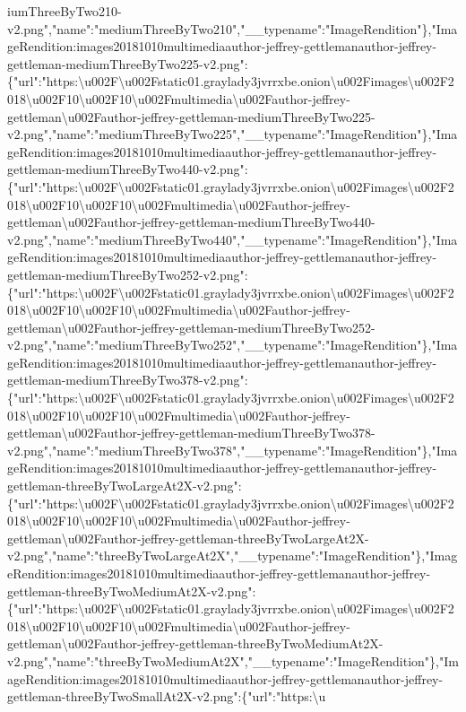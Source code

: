 iumThreeByTwo210-v2.png","name":"mediumThreeByTwo210","\_\_typename":"ImageRendition"\},"ImageRendition:images20181010multimediaauthor-jeffrey-gettlemanauthor-jeffrey-gettleman-mediumThreeByTwo225-v2.png":\{"url":"https:\textbackslash{}u002F\textbackslash{}u002Fstatic01.graylady3jvrrxbe.onion\textbackslash{}u002Fimages\textbackslash{}u002F2018\textbackslash{}u002F10\textbackslash{}u002F10\textbackslash{}u002Fmultimedia\textbackslash{}u002Fauthor-jeffrey-gettleman\textbackslash{}u002Fauthor-jeffrey-gettleman-mediumThreeByTwo225-v2.png","name":"mediumThreeByTwo225","\_\_typename":"ImageRendition"\},"ImageRendition:images20181010multimediaauthor-jeffrey-gettlemanauthor-jeffrey-gettleman-mediumThreeByTwo440-v2.png":\{"url":"https:\textbackslash{}u002F\textbackslash{}u002Fstatic01.graylady3jvrrxbe.onion\textbackslash{}u002Fimages\textbackslash{}u002F2018\textbackslash{}u002F10\textbackslash{}u002F10\textbackslash{}u002Fmultimedia\textbackslash{}u002Fauthor-jeffrey-gettleman\textbackslash{}u002Fauthor-jeffrey-gettleman-mediumThreeByTwo440-v2.png","name":"mediumThreeByTwo440","\_\_typename":"ImageRendition"\},"ImageRendition:images20181010multimediaauthor-jeffrey-gettlemanauthor-jeffrey-gettleman-mediumThreeByTwo252-v2.png":\{"url":"https:\textbackslash{}u002F\textbackslash{}u002Fstatic01.graylady3jvrrxbe.onion\textbackslash{}u002Fimages\textbackslash{}u002F2018\textbackslash{}u002F10\textbackslash{}u002F10\textbackslash{}u002Fmultimedia\textbackslash{}u002Fauthor-jeffrey-gettleman\textbackslash{}u002Fauthor-jeffrey-gettleman-mediumThreeByTwo252-v2.png","name":"mediumThreeByTwo252","\_\_typename":"ImageRendition"\},"ImageRendition:images20181010multimediaauthor-jeffrey-gettlemanauthor-jeffrey-gettleman-mediumThreeByTwo378-v2.png":\{"url":"https:\textbackslash{}u002F\textbackslash{}u002Fstatic01.graylady3jvrrxbe.onion\textbackslash{}u002Fimages\textbackslash{}u002F2018\textbackslash{}u002F10\textbackslash{}u002F10\textbackslash{}u002Fmultimedia\textbackslash{}u002Fauthor-jeffrey-gettleman\textbackslash{}u002Fauthor-jeffrey-gettleman-mediumThreeByTwo378-v2.png","name":"mediumThreeByTwo378","\_\_typename":"ImageRendition"\},"ImageRendition:images20181010multimediaauthor-jeffrey-gettlemanauthor-jeffrey-gettleman-threeByTwoLargeAt2X-v2.png":\{"url":"https:\textbackslash{}u002F\textbackslash{}u002Fstatic01.graylady3jvrrxbe.onion\textbackslash{}u002Fimages\textbackslash{}u002F2018\textbackslash{}u002F10\textbackslash{}u002F10\textbackslash{}u002Fmultimedia\textbackslash{}u002Fauthor-jeffrey-gettleman\textbackslash{}u002Fauthor-jeffrey-gettleman-threeByTwoLargeAt2X-v2.png","name":"threeByTwoLargeAt2X","\_\_typename":"ImageRendition"\},"ImageRendition:images20181010multimediaauthor-jeffrey-gettlemanauthor-jeffrey-gettleman-threeByTwoMediumAt2X-v2.png":\{"url":"https:\textbackslash{}u002F\textbackslash{}u002Fstatic01.graylady3jvrrxbe.onion\textbackslash{}u002Fimages\textbackslash{}u002F2018\textbackslash{}u002F10\textbackslash{}u002F10\textbackslash{}u002Fmultimedia\textbackslash{}u002Fauthor-jeffrey-gettleman\textbackslash{}u002Fauthor-jeffrey-gettleman-threeByTwoMediumAt2X-v2.png","name":"threeByTwoMediumAt2X","\_\_typename":"ImageRendition"\},"ImageRendition:images20181010multimediaauthor-jeffrey-gettlemanauthor-jeffrey-gettleman-threeByTwoSmallAt2X-v2.png":\{"url":"https:\textbackslash{}u